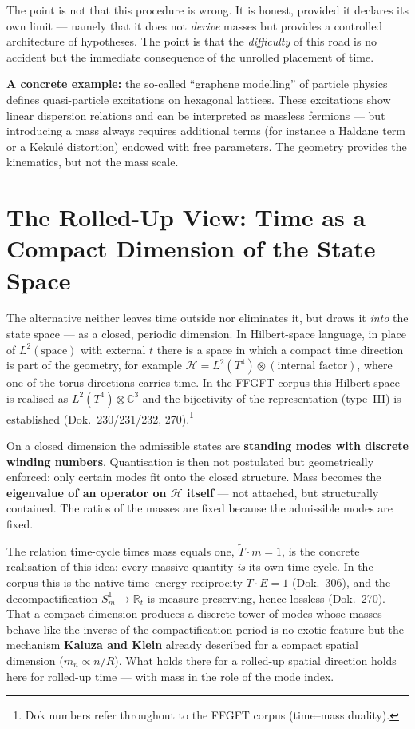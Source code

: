 The point is not that this procedure is wrong. It is honest, provided it declares its own limit --- namely that it does not \emph{derive} masses but provides a controlled architecture of hypotheses. The point is that the \emph{difficulty} of this road is no accident but the immediate consequence of the unrolled placement of time.

\textbf{A concrete example:} the so-called ``graphene modelling'' of particle physics defines quasi-particle excitations on hexagonal lattices. These excitations show linear dispersion relations and can be interpreted as massless fermions --- but introducing a mass always requires additional terms (for instance a Haldane term or a Kekulé distortion) endowed with free parameters. The geometry provides the kinematics, but not the mass scale.

\section{The Rolled-Up View: Time as a Compact Dimension of the State Space}

The alternative neither leaves time outside nor eliminates it, but draws it \emph{into} the state space --- as a closed, periodic dimension. In Hilbert-space language, in place of $L^2(\text{space})$ with external $t$ there is a space in which a compact time direction is part of the geometry, for example $\mathcal{H} = L^2(T^4)\otimes(\text{internal factor})$, where one of the torus directions carries time. In the FFGFT corpus this Hilbert space is realised as $L^2(T^4)\otimes\mathbb{C}^3$ and the bijectivity of the representation (type~III) is established (Dok.~230/231/232, 270).\footnote{Dok numbers refer throughout to the FFGFT corpus (time--mass duality).}

On a closed dimension the admissible states are \textbf{standing modes with discrete winding numbers}. Quantisation is then not postulated but geometrically enforced: only certain modes fit onto the closed structure. Mass becomes the \textbf{eigenvalue of an operator on $\mathcal{H}$ itself} --- not attached, but structurally contained. The ratios of the masses are fixed because the admissible modes are fixed.

The relation time-cycle times mass equals one, $\tilde{T}\cdot m = 1$, is the concrete realisation of this idea: every massive quantity \emph{is} its own time-cycle. In the corpus this is the native time--energy reciprocity $T\cdot E = 1$ (Dok.~306), and the decompactification $S^1_m\to\mathbb{R}_t$ is measure-preserving, hence lossless (Dok.~270). That a compact dimension produces a discrete tower of modes whose masses behave like the inverse of the compactification period is no exotic feature but the mechanism \textbf{Kaluza and Klein} already described for a compact spatial dimension ($m_n \propto n/R$). What holds there for a rolled-up spatial direction holds here for rolled-up time --- with mass in the role of the mode index.


